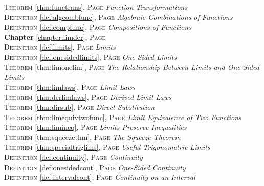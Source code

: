 \begin{multicols}{2}
{\textsc{Theorem} \ref{thm:functrans}, \textsc{Page} \pageref{thm:functrans} \textit{Function Transformations} \\
\textsc{Definition} \ref{def:algcombfunc}, \textsc{Page} \pageref{def:algcombfunc} \textit{Algebraic Combinations of Functions} \\
\textsc{Definition} \ref{def:compfunc}, \textsc{Page} \pageref{def:compfunc} \textit{Compositions of Functions} \\
\textbf{Chapter} \ref{chapter:limder}, \textsc{Page} \pageref{chapter:limder} \\
\textsc{Definition} \ref{def:limits}, \textsc{Page} \pageref{def:limits} \textit{Limits} \\
\textsc{Definition} \ref{def:onesidedlimits}, \textsc{Page} \pageref{def:onesidedlimits} \textit{One-Sided Limits} \\
\textsc{Theorem} \ref{thm:limonelim}, \textsc{Page} \pageref{thm:limonelim} \textit{The Relationship Between Limits and One-Sided Limits} \\
\textsc{Theorem} \ref{thm:limlaws}, \textsc{Page} \pageref{thm:limlaws} \textit{Limit Laws} \\
\textsc{Theorem} \ref{thm:derlimlaws}, \textsc{Page} \pageref{thm:derlimlaws} \textit{Derived Limit Laws} \\
\textsc{Theorem} \ref{thm:dirsub}, \textsc{Page} \pageref{thm:dirsub} \textit{Direct Substitution} \\
\textsc{Theorem} \ref{thm:limequivtwofunc}, \textsc{Page} \pageref{thm:limequivtwofunc} \textit{Limit Equivalence of Two Functions} \\
\textsc{Theorem} \ref{thm:limineq}, \textsc{Page} \pageref{thm:limineq} \textit{Limits Preserve Inequalities} \\
\textsc{Theorem} \ref{thm:squeezethm}, \textsc{Page} \pageref{thm:squeezethm} \textit{The Squeeze Theorem} \\
\textsc{Theorem} \ref{thm:specialtriglims}, \textsc{Page} \pageref{thm:specialtriglims} \textit{Useful Trigonometric Limits} \\
\textsc{Definition} \ref{def:continuity}, \textsc{Page} \pageref{def:continuity} \textit{Continuity} \\
\textsc{Definition} \ref{def:onesidedcont}, \textsc{Page} \pageref{def:onesidedcont} \textit{One-Sided Continuity} \\
\textsc{Definition} \ref{def:intervalcont}, \textsc{Page} \pageref{def:intervalcont} \textit{Continuity on an Interval} \\
}
\end{multicols}
